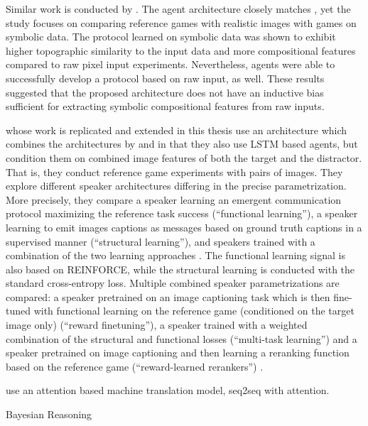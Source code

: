 Similar work is conducted by \cite{lazaridou2018emergence}. The agent architecture closely matches \cite{havrylov2017emergence}, yet the study focuses on comparing reference games with realistic images with games on symbolic data. The protocol learned on symbolic data was shown to exhibit higher topographic similarity to the input data and more compositional features compared to raw pixel input experiments. Nevertheless, agents were able to successfully develop a protocol based on raw input, as well. These results suggested that the proposed architecture does not have an inductive bias sufficient for extracting symbolic compositional features from raw inputs. 

\cite{lazaridou2020multi} whose work is replicated and extended in this thesis use an architecture which combines the architectures by \cite{lazaridou2016multi} and \cite{havrylov2017emergence} in that they also use LSTM based agents, but condition them on combined image features of both the target and the distractor. That is, they conduct reference game experiments with pairs of images. They explore different speaker architectures differing in the precise parametrization. More precisely, they compare a speaker learning an emergent communication protocol maximizing the reference task success (``functional learning''), a speaker learning to emit images captions as messages based on ground truth captions in a supervised manner (``structural learning''), and speakers trained with a combination of the two learning approaches \parencite[][p. 4]{lazaridou2020multi}. The functional learning signal is also based on REINFORCE, while the structural learning is conducted with the standard cross-entropy loss.  Multiple combined speaker parametrizations are compared: a speaker pretrained on an image captioning task which is then fine-tuned with functional learning on the reference game (conditioned on the target image only) (``reward finetuning''), a speaker trained with a weighted combination of the structural and functional losses (``multi-task learning'') and a speaker pretrained on image captioning and then learning a reranking function based on the reference game (``reward-learned rerankers'') \parencite[][p. 4--5]{lazaridou2020multi}. 

\cite{lee2019countering} use an attention based machine translation model, seq2seq with attention. 

Bayesian Reasoning \parencite{andreas2016reasoning}


